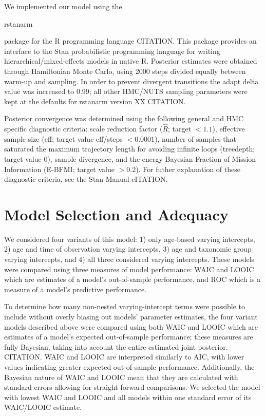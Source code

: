 \documentclass[12pt,letterpaper]{article}
\begin{document}
We implemented our model using the \begin{texttt}rstanarm\end{texttt} package for the R programming language CITATION. This package provides an interface to the Stan probabilistic programming language for writing hierarchical/mixed-effects models in native R. Posterior estimates were obtained through Hamiltonian Monte Carlo, using 2000 steps divided equally between warm-up and sampling. In order to prevent divergent transitions the adapt delta value was increased to 0.99; all other HMC/NUTS sampling parameters were kept at the defaults for rstanarm version XX CITATION. 

Posterior convergence was determined using the following general and HMC specific diagnostic criteria: scale reduction factor (\(\hat{R}\); target \(<1.1\)), effective sample size (eff; target value eff/steps \(<0.0001\)), number of samples that saturated the maximum trajectory length for avoiding infinite loops (treedepth; target value 0), sample divergence, and the energy Bayesian Fraction of Mission Information (E-BFMI; target value \(>0.2\)). For futher explanation of these diagnostic criteria, see the Stan Manual cITATION.


\section{Model Selection and Adequacy}

We considered four variants of this model: 1) only age-based varying intercepts, 2) age and time of observation varying intercepts, 3) age and taxonomic group varying intercepts, and 4) all three considered varying intercepts. These models were compared using three measures of model performance: WAIC and LOOIC which are estimates of a model's out-of-sample performance, and ROC which is a measure of a model's predictive performance.

To determine how many non-nested varying-intercept terms were possible to include without overly biasing out models' parameter estimates, the four variant models described above were compared using both WAIC and LOOIC which are estimates of a model's expected out-of-sample performance; these measures are fully Bayesian, taking into account the entire estimated joint posterior. CITATION. WAIC and LOOIC are interpreted similarly to AIC, with lower values indicating greater expected out-of-sample performance. Additionally, the Bayesian nature of WAIC and LOOIC mean that they are calculated with standard errors allowing for straight forward comparisons. We selected the model with lowest WAIC and LOOIC and all models within one standard error of its WAIC/LOOIC estimate.
\end{document}
